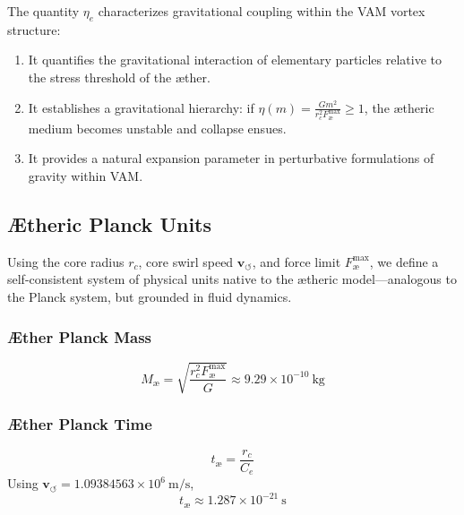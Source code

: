 \documentclass[preprint]{revtex4-2}
\begin{document}
                The quantity \( \eta_e \) characterizes gravitational coupling within the VAM vortex structure:

                \begin{enumerate}
                    \item It quantifies the gravitational interaction of elementary particles relative to the stress threshold of the æther.
                    \item It establishes a gravitational hierarchy: if \( \eta(m) = \frac{G m^2}{r_c^2 F_{\text{\ae}}^{\text{max}}} \geq 1 \), the ætheric medium becomes unstable and collapse ensues.
                    \item It provides a natural expansion parameter in perturbative formulations of gravity within VAM.
                \end{enumerate}

                \subsection*{Ætheric Planck Units}

                Using the core radius \( r_c \), core swirl speed \( \mathbf{v}_{\scriptscriptstyle\boldsymbol{\circlearrowleft}} \), and force limit \( F_{\text{\ae}}^{\text{max}} \), we define a self-consistent system of physical units native to the ætheric model—analogous to the Planck system, but grounded in fluid dynamics.

                \subsubsection*{Æther Planck Mass}
                \begin{equation}
                M_{\text{\ae}} = \sqrt{\frac{r_c^2 F_{\text{\ae}}^{\text{max}}}{G}} \approx \boxed{9.29 \times 10^{-10}~\text{kg}}
                \end{equation}

                \subsubsection*{Æther Planck Time}
                \begin{equation}
                t_{\text{\ae}} = \frac{r_c}{C_e}
                \end{equation}
                Using \( \mathbf{v}_{\scriptscriptstyle\boldsymbol{\circlearrowleft}} = 1.09384563 \times 10^6~\text{m/s} \),
                \begin{equation}
                t_{\text{\ae}} \approx \boxed{1.287 \times 10^{-21}~\text{s}}
                \end{equation}
\end{document}
